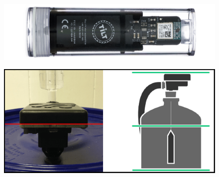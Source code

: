 \begin{figure}[h]
    \centering
    \includegraphics[scale=0.45]{figuras/contexto/tilt.png}
    \label{fig:tilt}
\end{figure}

\begin{figure}[h]
    \centering
    \includegraphics[scale=0.35]{figuras/contexto/beerbug.png}
    \label{fig:beerbug}
\end{figure}

